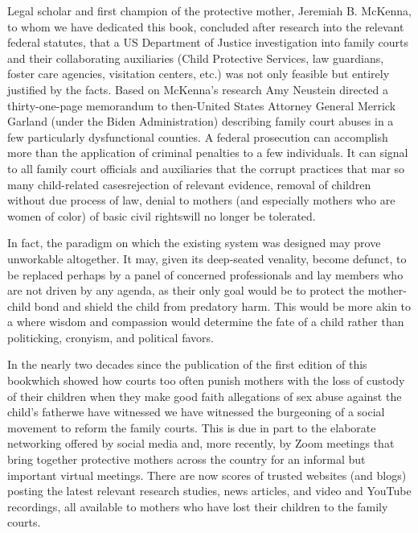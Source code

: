 Legal scholar and first champion of the protective mother, Jeremiah
B. McKenna, to whom we have dedicated this book, concluded after
research into the relevant federal statutes, that a US Department of 
Justice investigation into family courts and their collaborating auxiliaries
(Child Protective Services, law guardians, foster care agencies, 
visitation centers, etc.) was not only feasible but entirely justified by the facts.
Based on McKenna’s research Amy Neustein directed a thirty-one-page
memorandum to then-United States Attorney General Merrick Garland
(under the Biden Administration) describing family court abuses in
a few particularly dysfunctional counties. A federal prosecution can
accomplish more than the application of criminal penalties to a few individuals. 
It can signal to all family court officials and auxiliaries that the
corrupt practices that mar so many child-related cases\mdash{}rejection of 
relevant evidence, removal of children without due process of law, denial
to mothers (and especially mothers who are women of color) of basic
civil rights\mdash{}will no longer be tolerated. \pfl{}

In fact, the paradigm on which the existing system was designed
may prove unworkable altogether. It may, given its deep-seated venality,
become defunct, to be replaced perhaps by a panel of concerned 
professionals and lay members who are not driven by any agenda, as their only
goal would be to protect the mother-child bond and shield the child
from predatory harm. This would be more akin to a \mdash{}where wisdom and compassion would determine the fate of a
child rather than politicking, cronyism, and political favors. \pfl{}






\noindent{}In the nearly two decades since the publication of the first edition of this
book\mdash{}which showed how courts too often punish mothers with the
loss of custody of their children when they make good faith allegations
of sex abuse against the child's father\mdash{}we have witnessed we have witnessed the burgeoning
of a social movement to reform the family courts.  This is due in part to the elaborate networking offered by social media and, more recently, by Zoom
meetings that bring together protective mothers across the country for
an informal but important virtual meetings. There are now scores of trusted websites (and blogs) posting the latest relevant research studies, news articles, and
video and YouTube recordings, all available to mothers who have lost
their children to the family courts. \pfl{}

